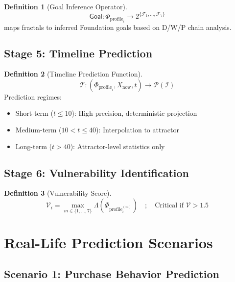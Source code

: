 \documentclass[11pt,twoside]{book}
\theoremstyle{definition}
\newtheorem{definition}{Definition}[chapter]
\theoremstyle{plain}
\theoremstyle{remark}
\newcommand{\Ideas}{\mathcal{I}}
\newcommand{\Foundations}{\mathcal{F}}
\newcommand{\Lacunarity}{\Lambda}
\newcommand{\ProfileFrac}{\Phi_{\mathrm{profile}}}
\newcommand{\VulnScore}{\mathcal{V}}
\newcommand{\Timeline}{\mathcal{T}}
\begin{document}
\begin{definition}[Goal Inference Operator]
\[
\boxed{
    \mathsf{Goal} : \ProfileFrac_i \longrightarrow 2^{\{\Foundations_1, \ldots, \Foundations_7\}}
}
\]
maps fractals to inferred Foundation goals based on D/W/P chain analysis.
\end{definition}

\section{Stage 5: Timeline Prediction}

\begin{definition}[Timeline Prediction Function]
\[
\boxed{
    \Timeline : (\ProfileFrac_i, X_{\text{now}}, t) \longrightarrow \mathcal{P}(\Ideas)
}
\]
Prediction regimes:
\begin{itemize}
    \item Short-term ($t \leq 10$): High precision, deterministic projection
    \item Medium-term ($10 < t \leq 40$): Interpolation to attractor
    \item Long-term ($t > 40$): Attractor-level statistics only
\end{itemize}
\end{definition}

\section{Stage 6: Vulnerability Identification}

\begin{definition}[Vulnerability Score]
\[
\boxed{
    \VulnScore_i = \max_{m \in \{1,\ldots,7\}} \Lacunarity(\ProfileFrac_i^{(m)})
    \quad ; \quad \text{Critical if } \VulnScore > 1.5
}
\]
\end{definition}

\chapter{Real-Life Prediction Scenarios}
\label{ch:pred-scenarios}

\section{Scenario 1: Purchase Behavior Prediction}
\end{document}
